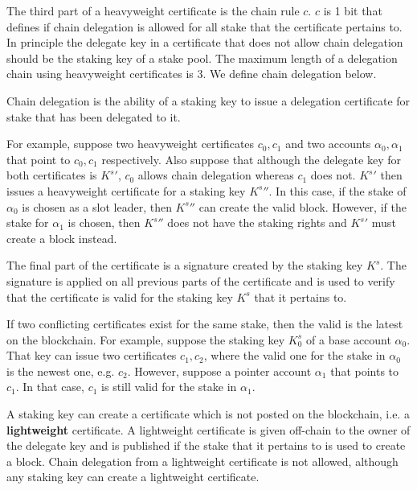 The third part of a heavyweight certificate is the chain rule $c$. $c$ is 1 bit that defines if chain delegation is allowed for all stake that the certificate pertains to. In principle the delegate key in a certificate that does not allow chain delegation should be the staking key of a stake pool. The maximum length of a delegation chain using heavyweight certificates is 3. We define chain delegation below.

\begin{defn}\label{def:chain_delegation}
Chain delegation is the ability of a staking key to issue a delegation certificate for stake that has been delegated to it.
\end{defn}

For example, suppose two heavyweight certificates $c_0, c_1$ and two accounts $\alpha_0, \alpha_1$ that point to $c_0, c_1$ respectively. Also suppose that although the delegate key for both certificates is ${K^s}'$, $c_0$ allows chain delegation whereas $c_1$ does not. ${K^s}'$ then issues a heavyweight certificate for a staking key ${K^s}''$. In this case, if the stake of $\alpha_0$ is chosen as a slot leader, then ${K^s}''$ can create the valid block. However, if the stake for $\alpha_1$ is chosen, then ${K^s}''$ does not have the staking rights and ${K^s}'$ must create a block instead.

The final part of the certificate is a signature created by the staking key $K^s$. The signature is applied on all previous parts of the certificate and is used to verify that the certificate is valid for the staking key $K^s$ that it pertains to.

If two conflicting certificates exist for the same stake, then the valid is the latest on the blockchain. For example, suppose the staking key $K^s_0$ of a base account $\alpha_0$. That key can issue two certificates $c_1, c_2$, where the valid one for the stake in $\alpha_0$ is the newest one, e.g. $c_2$. However, suppose a pointer account $\alpha_1$ that points to $c_1$. In that case, $c_1$ is still valid for the stake in $\alpha_1$.

A staking key can create a certificate which is not posted on the blockchain, i.e. a \textbf{lightweight} certificate. A lightweight certificate is given off-chain to the owner of the delegate key and is published if the stake that it pertains to is used to create a block. Chain delegation from a lightweight certificate is not allowed, although any staking key can create a lightweight certificate.

